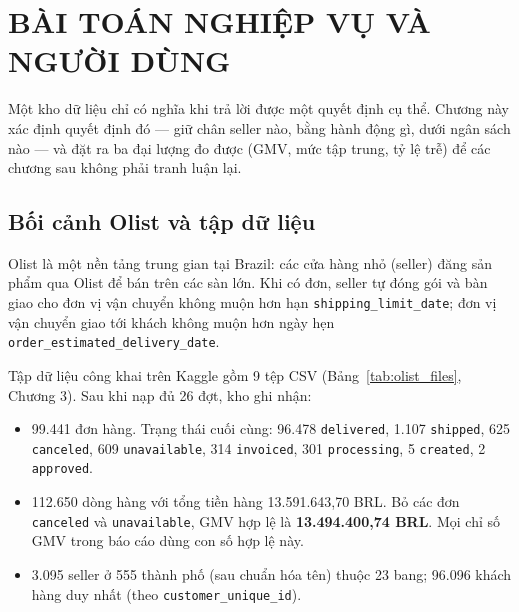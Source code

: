 \section{BÀI TOÁN NGHIỆP VỤ VÀ NGƯỜI DÙNG}
\suppressfloats[t]

Một kho dữ liệu chỉ có nghĩa khi trả lời được một quyết định cụ thể. Chương này xác định quyết định đó — giữ chân seller nào, bằng hành động gì, dưới ngân sách nào — và đặt ra ba đại lượng đo được (GMV, mức tập trung, tỷ lệ trễ) để các chương sau không phải tranh luận lại.

\begin{center}
\noindent{}
\end{center}
\vspace{0.2cm}

\subsection{Bối cảnh Olist và tập dữ liệu}
Olist là một nền tảng trung gian tại Brazil: các cửa hàng nhỏ (seller) đăng sản phẩm qua Olist để bán trên các sàn lớn. Khi có đơn, seller tự đóng gói và bàn giao cho đơn vị vận chuyển không muộn hơn hạn \texttt{shipping\_limit\_date}; đơn vị vận chuyển giao tới khách không muộn hơn ngày hẹn \texttt{order\_estimated\_delivery\_date}.

Tập dữ liệu công khai trên Kaggle gồm 9 tệp CSV (Bảng~\ref{tab:olist_files}, Chương 3). Sau khi nạp đủ 26 đợt, kho ghi nhận:
\begin{itemize}
    \item 99.441 đơn hàng. Trạng thái cuối cùng: 96.478 \texttt{delivered}, 1.107 \texttt{shipped}, 625 \texttt{canceled}, 609 \texttt{unavailable}, 314 \texttt{invoiced}, 301 \texttt{processing}, 5 \texttt{created}, 2 \texttt{approved}.
    \item 112.650 dòng hàng với tổng tiền hàng 13.591.643,70 BRL. Bỏ các đơn \texttt{canceled} và \texttt{unavailable}, GMV hợp lệ là \textbf{13.494.400,74 BRL}. Mọi chỉ số GMV trong báo cáo dùng con số hợp lệ này.
    \item 3.095 seller ở 555 thành phố (sau chuẩn hóa tên) thuộc 23 bang; 96.096 khách hàng duy nhất (theo \texttt{customer\_unique\_id}).
\end{itemize}

